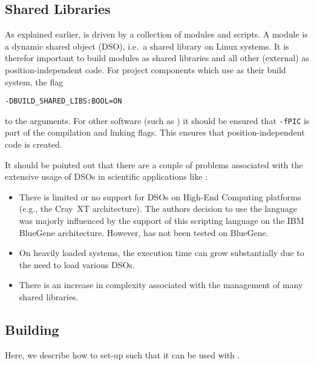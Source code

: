 \subsection{Shared Libraries}

As explained earlier, \MACI is driven by a collection of \PYTHON modules and \PYTHON scripts. A \PYTHON module is a dynamic shared object (DSO), i.e.~a shared library on Linux systems. It is therefor important to build \PYTHON modules as shared libraries and all other (external) as position-independent code. For project components which use \CMAKE as their build system, the flag
\begin{lstlisting}[style=SHELL]
	-DBUILD_SHARED_LIBS:BOOL=ON
\end{lstlisting}
to the \CMAKE arguments. For other software (such as \LAMMPS) it should be ensured that \lstinline[style=CODE]|-fPIC| is part of the compilation and linking flags. This ensures that position-independent code is created.

It should be pointed out that there are a couple of problems associated with the extensive usage of DSOs in scientific applications like \MACI:
\begin{itemize}
\item There is limited or no support for DSOs on High-End Computing platforms (e.g., the Cray~XT architecture). The authors decision to use the \PYTHON language was majorly influenced by the support of this scripting language on the IBM BlueGene architecture. However, \MACI has not been tested on BlueGene.
\item On heavily loaded systems, the execution time can grow substantially due to the need to load various DSOs.
\item There is an increase in complexity associated with the management of many shared libraries.
\end{itemize} 

\subsection{Building \LAMMPS}

Here, we describe how to set-up \LAMMPS such that it can be used with \MACI.

